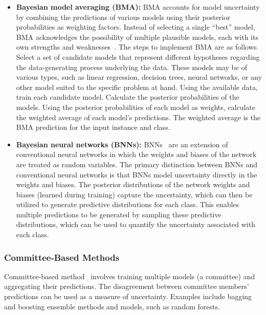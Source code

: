 \documentclass[pdflatex,bst/sn-basic]{bst/sn-jnl}%
\begin{document}
\begin{itemize}
    \item \relax \textbf{Bayesian model averaging (BMA):} BMA accounts for model uncertainty by combining the predictions of various models using their posterior probabilities as weighting factors. Instead of selecting a single ``best'' model, BMA acknowledges the possibility of multiple plausible models, each with its own strengths and weaknesses~\cite{hoeting_Bayesian_1999}. The steps to implement BMA are as follows. Select a set of candidate models that represent different hypotheses regarding the data-generating process underlying the data. These models may be of various types, such as linear regression, decision trees, neural networks, or any other model suited to the specific problem at hand. Using the available data, train each candidate model. Calculate the posterior probabilities of the models. Using the posterior probabilities of each model as weights, calculate the weighted average of each model's predictions. The weighted average is the BMA prediction for the input instance and class.

    \item \relax \textbf{Bayesian neural networks (BNNs):} BNNs~\cite{mullachery_Bayesian_2018} are an extension of conventional neural networks in which the weights and biases of the network are treated as random variables. The primary distinction between BNNs and conventional neural networks is that BNNs model uncertainty directly in the weights and biases. The posterior distributions of the network weights and biases (learned during training) capture the uncertainty, which can then be utilized to generate predictive distributions for each class. This enables multiple predictions to be generated by sampling these predictive distributions, which can be used to quantify the uncertainty associated with each class.
\end{itemize}

\subsubsection{Committee-Based Methods}

Committee-based method~\cite{wang_Wisdom_2020} involves training multiple models (a committee) and aggregating their predictions. The disagreement between committee members' predictions can be used as a measure of uncertainty. Examples include bagging and boosting ensemble methods and models, such as random forests.
\end{document}
